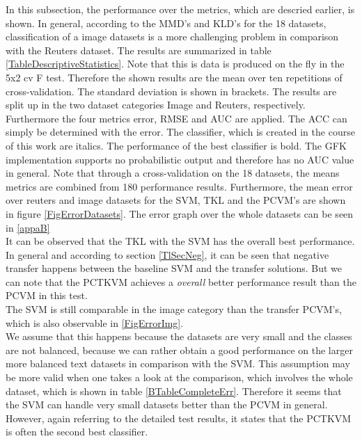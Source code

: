 In this subsection, the performance over the metrics, which are descried earlier, is shown.
In general, according to the \acs{MMD}'s and \acs{KLD}'s for the 18 datasets, classification of a image datasets is a more challenging problem in comparison with the Reuters dataset.
The results are summarized in table \ref{TableDescriptiveStatistics}. 
Note that this is data is produced on the fly in the 5x2 cv F test. Therefore the shown results are the mean over ten repetitions of cross-validation.
The standard deviation is shown in brackets. 
The results are split up in the two dataset categories Image and Reuters, respectively.
Furthermore the four metrics error, \acs{RMSE} and \acs{AUC} are applied.
The \ac{ACC} can simply be determined with the error.
The classifier, which is created in the course of this work are italics.
The performance of the best classifier is bold.
The \acs{GFK} implementation supports no probabilistic output and therefore has no \acs{AUC} value in general.
Note that through a cross-validation on the 18 datasets, the means metrics are combined from 180 performance results.
Furthermore, the mean error over reuters and image datasets for the \acs{SVM}, \acs{TKL} and the \acs{PCVM}'s are shown in figure \ref{FigErrorDatasets}. The error graph over the whole datasets can be seen in \ref{appaB}\\
It can be observed that the \acs{TKL} with the \acs{SVM} has the overall best performance. 
In general and according to section \ref{TlSecNeg}, it can be seen that negative transfer happens between the baseline \acs{SVM} and the transfer solutions.
But we can note that the \acs{PCTKVM}  achieves a \textit{overall} better performance result than the \acs{PCVM} in this test.\\
The \acs{SVM} is still comparable in the image category than the transfer \acs{PCVM}'s, which is also observable in \ref{FigErrorImg}.\\
We assume that this happens because the datasets are very small and the classes are not balanced, because we can rather obtain a good performance on the larger more balanced text datasets in comparison with the \acs{SVM}.
This assumption may be more valid when one takes a look at the comparison, which involves the whole dataset, which is shown in table \ref{BTableCompleteErr}.
Therefore it seems that the \acs{SVM} can handle very small datasets better than the \acs{PCVM} in general. However, again referring to the detailed test results, it states that the \acs{PCTKVM} is often the second best classifier.\\
